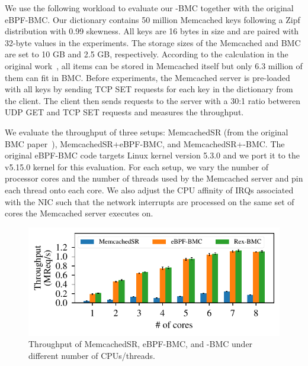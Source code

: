 We use the following workload to evaluate our \projname{}-BMC together with the
    original eBPF-BMC.
Our dictionary contains 50 million Memcached keys following a Zipf
    distribution with 0.99 skewness.
All keys are 16 bytes in size and are paired with 32-byte values in the
    experiments.
The storage sizes of the Memcached and BMC are set to 10 GB and 2.5 GB,
    respectively.
According to the calculation in the original work~\cite{BMC}, all items
    can be stored in Memcached itself but only 6.3 million of them can fit in
    BMC.
Before experiments, the Memcached server is pre-loaded with all keys by
    sending TCP SET requests for each key in the dictionary from the client.
The client then sends requests to the server with a 30:1 ratio betweren UDP GET
    and TCP SET requests and measures the throughput.

We evaluate the throughput of three setups: MemcachedSR (from the original BMC
    paper~\cite{BMC}), MemcachedSR+eBPF-BMC, and MemcachedSR+\projname{}-BMC.
The original eBPF-BMC code targets Linux kernel version 5.3.0 and we
    port it to the v5.15.0 \projname{} kernel for this evaluation.
For each setup, we vary the number of processor cores and the number of threads
    used by the Memcached server and pin each thread onto each core.
We also adjust the CPU affinity of IRQs associated with the NIC such that the
    network interrupts are processed on the same set of cores the Memcached
    server executes on.

\begin{figure}[t]
    \includegraphics[width=1.0\linewidth]{figs/bmc.pdf}
    \centering
    \vspace{-25pt}
    \caption{Throughput of MemcachedSR, eBPF-BMC, and \projname{}-BMC
        under different number of CPUs/threads.
    }
    \label{fig:eval-bmc}
    \vspace{-12pt}
\end{figure}

